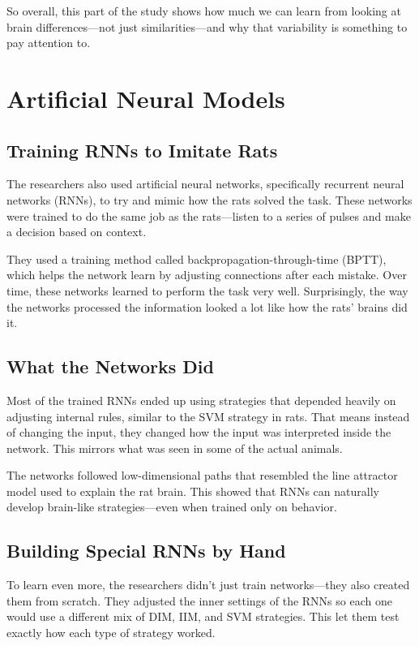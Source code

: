 \documentclass{article}
\begin{document}
So overall, this part of the study shows how much we can learn from looking at brain differences—not just similarities—and why that variability is something to pay attention to.


\section{Artificial Neural Models}

\subsection{Training RNNs to Imitate Rats}
The researchers also used artificial neural networks, specifically recurrent neural networks (RNNs), to try and mimic how the rats solved the task. These networks were trained to do the same job as the rats—listen to a series of pulses and make a decision based on context.

They used a training method called backpropagation-through-time (BPTT), which helps the network learn by adjusting connections after each mistake. Over time, these networks learned to perform the task very well. Surprisingly, the way the networks processed the information looked a lot like how the rats’ brains did it.

\subsection{What the Networks Did}
Most of the trained RNNs ended up using strategies that depended heavily on adjusting internal rules, similar to the SVM strategy in rats. That means instead of changing the input, they changed how the input was interpreted inside the network. This mirrors what was seen in some of the actual animals.

The networks followed low-dimensional paths that resembled the line attractor model used to explain the rat brain. This showed that RNNs can naturally develop brain-like strategies—even when trained only on behavior.

\subsection{Building Special RNNs by Hand}
To learn even more, the researchers didn’t just train networks—they also created them from scratch. They adjusted the inner settings of the RNNs so each one would use a different mix of DIM, IIM, and SVM strategies. This let them test exactly how each type of strategy worked.
\end{document}
